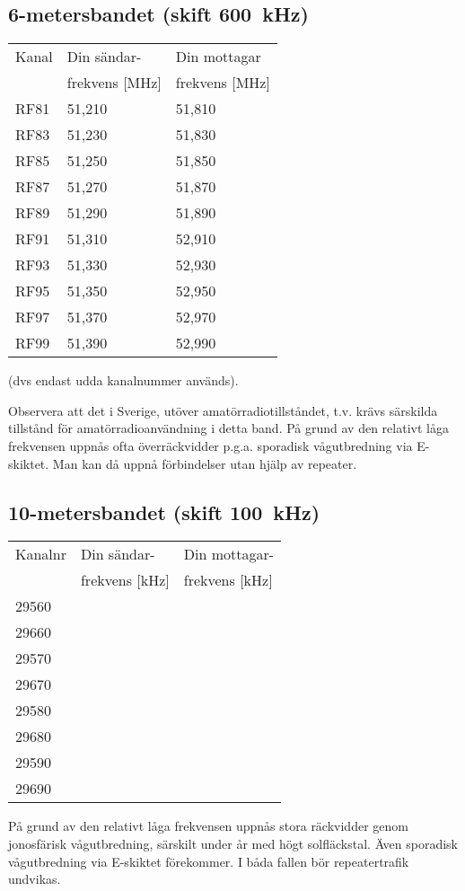 \subsection{6-metersbandet (skift 600~kHz)}
\begin{tabular}{ l | l | l }
  Kanal & Din sändar- & Din mottagar \\
        & frekvens [MHz] & frekvens [MHz] \\
  \hline
  RF81 & 51,210 & 51,810 \\
  RF83 & 51,230 & 51,830 \\
  RF85 & 51,250 & 51,850 \\
  RF87 & 51,270 & 51,870 \\
  RF89 & 51,290 & 51,890 \\
  RF91 & 51,310 & 52,910 \\
  RF93 & 51,330 & 52,930 \\
  RF95 & 51,350 & 52,950 \\
  RF97 & 51,370 & 52,970 \\
  RF99 & 51,390 & 52,990 \\
\end{tabular}
(dvs endast udda kanalnummer används).

Observera att det i Sverige, utöver amatörradiotillståndet, t.v. krävs
särskilda tillstånd för amatörradioanvändning i detta band.
På grund av den relativt låga frekvensen uppnås ofta överräckvidder p.g.a.
sporadisk vågutbredning via E-skiktet.
Man kan då uppnå förbindelser utan hjälp av repeater.

\subsection{10-metersbandet (skift 100~kHz)}
\begin{tabular}{ l | l | l }
Kanalnr & Din sändar- & Din mottagar- \\
        & frekvens [kHz] & frekvens [kHz] \\
  \hline
29560 \\
29660 \\
29570 \\
29670 \\
29580 \\
29680 \\
29590 \\
29690 \\
\end{tabular}
På grund av den relativt låga frekvensen uppnås stora räckvidder genom
jonosfärisk vågutbredning, särskilt under år med högt solfläckstal.
Även sporadisk vågutbredning via E-skiktet förekommer.
I båda fallen bör repeatertrafik undvikas.

